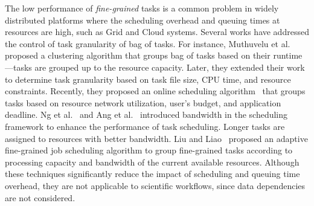



The low performance of \emph{fine-grained} tasks is a common problem in widely distributed platforms where the scheduling overhead and queuing times at resources are high, such as Grid and Cloud systems. Several works have addressed the control of task granularity of bag of tasks. For instance, Muthuvelu et al.~\cite{Muthuvelu:2005:DJG:1082290.1082297} proposed a clustering algorithm that groups bag of tasks based on their runtime---tasks are grouped up to the resource capacity. Later, they extended their work~\cite{4493929} to determine task granularity based on task file size, CPU time, and resource constraints. Recently, they proposed an online scheduling algorithm~\cite{Muthuvelu2010,Muthuvelu2013170} that groups tasks based on resource network utilization, user's budget, and application deadline. Ng et al.~\cite{keat-2006} and Ang et al.~\cite{ang-2009} introduced bandwidth in the scheduling framework to enhance the performance of task scheduling. Longer tasks are assigned to resources with better bandwidth. Liu and Liao~\cite{4958835} proposed an adaptive fine-grained job scheduling algorithm to group fine-grained tasks according to processing capacity and bandwidth of the current available resources. Although these techniques significantly reduce the impact of scheduling and queuing time overhead, they are not applicable to scientific workflows, since data dependencies are not considered.


